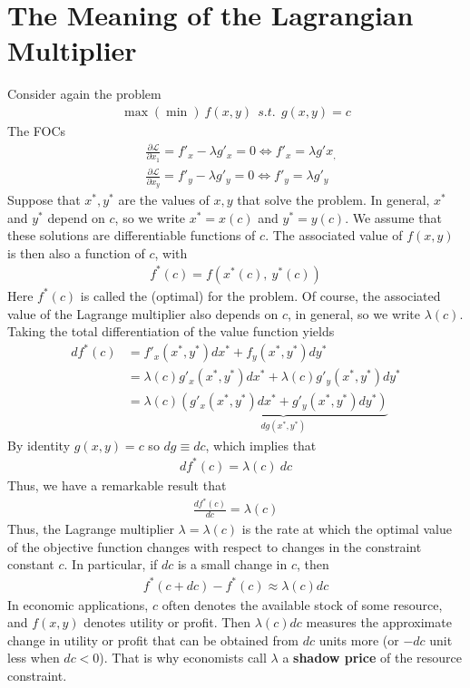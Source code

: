 \documentclass[10pt,a4paper]{book}
\theoremstyle{definition}\newtheorem{definition}{Definition}
\theoremstyle{definition}\newtheorem{fact}{Fact}
\theoremstyle{definition}\newtheorem{ex}{Ex.}
\theoremstyle{definition}\newtheorem{project}{Project}
\theoremstyle{definition}\newtheorem{problem}{Problem}
\theoremstyle{definition}\newtheorem{example}{Example}
\numberwithin{theorem}{chapter}
\numberwithin{corollary}{chapter}
\numberwithin{assumption}{chapter}
\numberwithin{definition}{chapter}
\numberwithin{prop}{chapter}
\numberwithin{notation}{chapter}
\numberwithin{problem}{chapter}
\numberwithin{example}{chapter}
\numberwithin{fact}{chapter}
\numberwithin{ex}{chapter}
\begin{document}
	
	\section{The Meaning of the Lagrangian Multiplier}
	Consider again the problem
	\begin{align*}
		\max (\min) \ f(x,y) \ \ s.t. \ \ g(x,y) = c 
	\end{align*}
	The FOCs
	\begin{align*}
		& \frac{\partial \mathcal{L}}{\partial x_1} = f'_x - \lambda g'_x = 0 \iff f'_x = \lambda g'x_, \\
		& \frac{\partial \mathcal{L}}{\partial x_y} = f'_y - \lambda g'_y = 0 \iff f'_y = \lambda g'_y  
	\end{align*}
	Suppose that $x^*, y^*$ are the values of $x, y$ that solve the problem. In general, $x^*$ and $y^*$ depend on $c$, so we write $x^* = x(c)$ and $y^* = y(c)$. We assume that these solutions are differentiable functions of $c$. The associated value of $f(x, y)$ is then also a function of $c$, with
	\begin{align*}
		f^*(c) = f(x^*(c), \ y^*(c)) 
	\end{align*}
	Here $f^*(c)$ is called the (optimal)  for the problem. Of course, the associated value of the Lagrange multiplier also depends on $c$, in general, so we write $\lambda (c)$. Taking the total differentiation of the value function yields
	\begin{align*}
		df^*(c) & = f'_x (x^*,y^*) dx^* + f_y (x^*, y^*) dy^*                                         \\
		& = \lambda(c) g'_x(x^*,y^*) dx^* + \lambda(c) g'_y (x^*, y^*) dy^*                   \\
		& = \lambda(c) \underbrace{(g'_x(x^*,y^*) dx^* + g'_y (x^*, y^*) dy^*)}_{dg(x^*,y^*)} 
	\end{align*}
	By identity $g(x,y) = c$ so $dg \equiv dc$, which implies that
	\begin{align*}
		df^*(c) = \lambda(c) \ dc 
	\end{align*}
	Thus, we have a remarkable result that
	\begin{align*}
		\frac{d f^*(c)}{dc} = \lambda (c) 
	\end{align*}
	Thus, the Lagrange multiplier $\lambda = \lambda(c)$ is the rate at which the optimal value of the objective function changes with respect to changes in the constraint constant $c$. In particular, if $dc$ is a small change in $c$, then
	\begin{align*}
		f^* (c+dc) - f^*(c) \approx \lambda(c) dc 
	\end{align*}
	In economic applications, $c$ often denotes the available stock of some resource, and $f (x, y)$ denotes utility or profit. Then $\lambda(c) dc$ measures the approximate change in utility or profit that can be obtained from $dc$ units more (or $-dc$ unit less when $dc<0$).  That is why economists call $\lambda$ a \textbf{shadow price} of the resource constraint.
	
\end{document}
